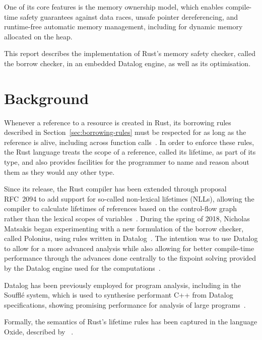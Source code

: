 \documentclass{UUThesisTemplate}
\begin{document}
One of its core features is the memory ownership model, which enables
compile-time safety guarantees against data races, unsafe pointer dereferencing,
and runtime-free automatic memory management, including for dynamic memory
allocated on the heap.

This report describes the implementation of Rust's memory safety checker, called
the borrow checker, in an embedded Datalog engine, as well as its optimisation.


\chapter{Background}
Whenever a reference to a resource is created in Rust, its borrowing rules
described in Section~\ref{sec:borrowing-rules} must be respected for as long as
the reference is alive, including across function
calls~\cite{nichols_rust_nodate}. In order to enforce these rules, the Rust
language treats the scope of a reference, called its lifetime, as part of its
type, and also provides facilities for the programmer to name and reason about
them as they would any other type.

Since its release, the Rust compiler has been extended through proposal RFC~2094
to add support for so-called non-lexical lifetimes (NLLs), allowing the compiler
to calculate lifetimes of references based on the control-flow graph rather than
the lexical scopes of variables~\cite{noauthor_rfc_2019}. During the spring of
2018, Nicholas Matsakis began experimenting with a new formulation of the borrow
checker, called Polonius, using rules written in
Datalog~\cite{matsakis_alias-based_2018}. The intention was to use Datalog to
allow for a more advanced analysis while also allowing for better compile-time
performance through the advances done centrally to the fixpoint solving provided
by the Datalog engine used for the computations~\cite{datafrog}.

Datalog has been previously employed for program analysis, including in the
Souffl{\'e} system, which is used to synthesise performant C++ from Datalog
specifications, showing promising performance for analysis of large
programs~\cite{scholz_fast_2016}.

Formally, the semantics of Rust's lifetime rules has been captured in the
language Oxide, described by
\citeauthor{weiss_oxide:_2019}~\cite{weiss_oxide:_2019}.

\end{document}
